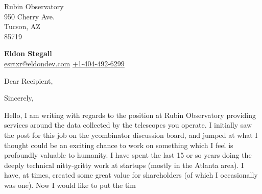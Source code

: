 \documentclass[letterpaper,10pt]{letter}
\begin{document}
\begin{letter}  {Rubin Observatory \\950 Cherry Ave. \\Tucson, AZ \\85719}


\raggedleft
	\textbf{\LARGE Eldon Stegall } \\
	\large
	\vspace{+3pt}
	\small
	\hspace{.5pt} \href{mailto:esrtxr@eldondev.com}{\color{blue}esrtxr@eldondev.com}
	\hspace{.5pt} \href{tel:+1-404-492-6299}{\color{blue}+1-404-492-6299}

\opening{Dear Recipient,}
\closing{Sincerely,}

Hello, I am writing with regards to the position at Rubin Observatory providing
services around the data collected by the telescopes you operate.  I initially
saw the post for this job on the ycombinator discussion board, and jumped at
what I thought could be an exciting chance to work on something which I feel is
profoundly valuable to humanity. I have spent the last 15 or so years doing the
deeply technical nitty-gritty work at startups (mostly in the Atlanta area). I
have, at times, created some great value for shareholders (of which I
occasionally was one). Now I would like to put the tim
\end{letter}
\end{document}

